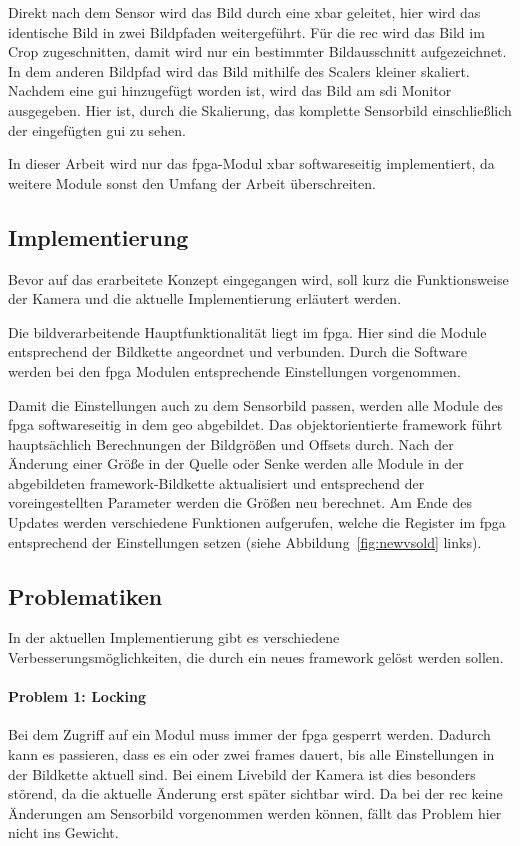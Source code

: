 Direkt nach dem Sensor wird das Bild durch eine \ac{xbar} geleitet, hier wird das identische Bild in zwei Bildpfaden weitergeführt. Für die \acl{rec} wird das Bild im Crop zugeschnitten, damit wird nur ein bestimmter Bildausschnitt aufgezeichnet. In dem anderen Bildpfad wird das Bild mithilfe des Scalers kleiner skaliert. Nachdem eine \ac{gui} hinzugefügt worden ist, wird das Bild am \ac{sdi} Monitor ausgegeben. Hier ist, durch die Skalierung, das komplette Sensorbild einschließlich der eingefügten \ac{gui} zu sehen.

In dieser Arbeit wird nur das \ac{fpga}-Modul \ac{xbar} softwareseitig implementiert, da weitere Module sonst den Umfang der Arbeit überschreiten.

\subsection{Implementierung}
Bevor auf das erarbeitete Konzept eingegangen wird, soll kurz die Funktionsweise der Kamera und die aktuelle Implementierung erläutert werden.

Die bildverarbeitende Hauptfunktionalität liegt im \ac{fpga}. Hier sind die Module entsprechend der Bildkette angeordnet und verbunden. Durch die Software werden bei den \ac{fpga} Modulen entsprechende Einstellungen vorgenommen.

Damit die Einstellungen auch zu dem Sensorbild passen, werden alle Module des \ac{fpga} softwareseitig in dem \ac{geo} abgebildet. Das objektorientierte \gls{framework} führt hauptsächlich Berechnungen der Bildgrößen und Offsets durch. Nach der Änderung einer Größe in der Quelle oder Senke werden alle Module in der abgebildeten \gls{framework}-Bildkette aktualisiert und entsprechend der voreingestellten Parameter werden die Größen neu berechnet. Am Ende des Updates werden verschiedene Funktionen aufgerufen, welche die Register im \ac{fpga} entsprechend der Einstellungen setzen (siehe Abbildung~\ref{fig:newvsold} links).


\subsection{Problematiken}\label{sec:prob}
In der aktuellen Implementierung gibt es verschiedene Verbesserungsmöglichkeiten, die durch ein neues \gls{framework} gelöst werden sollen.

\paragraph*{Problem 1: Locking} Bei dem Zugriff auf ein Modul muss immer der \ac{fpga} gesperrt werden. Dadurch kann es passieren, dass es ein oder zwei \glspl{frame} dauert, bis alle Einstellungen in der Bildkette aktuell sind. Bei einem Livebild der Kamera ist dies besonders störend, da die aktuelle Änderung erst später sichtbar wird. Da bei der \acl{rec} keine Änderungen am Sensorbild vorgenommen werden können, fällt das Problem hier nicht ins Gewicht.

